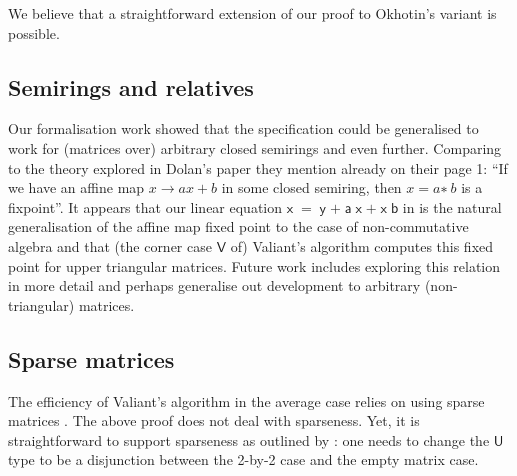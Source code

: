 \documentclass{CSML}
\numberwithin{theorem}{section}
\newcommand{\Conid}[1]{\mathit{#1}}
\newcommand{\Varid}[1]{\mathit{#1}}
\renewcommand\Varid[1]{\ensuremath{\mathsf{#1}}}
\renewcommand\Conid[1]{\ensuremath{\mathsf{#1}}}
\begin{document}
We believe that a straightforward extension of our proof to Okhotin's
variant is possible.

\subsection{Semirings and relatives}

Our formalisation work showed that the specification could be
generalised to work for (matrices over) arbitrary closed semirings
\citep{dolan_fun_2013} and even further.
Comparing to the theory explored in Dolan's paper they mention
already on their page 1:
``If we have an affine map $x → ax + b$ in some closed semiring, then
$x = a{∗~} b$ is a fixpoint''.
It appears that our linear equation \ensuremath{\Varid{x}\;\mathrel{=}\;\Varid{y}\;\Varid{+}\;\Varid{a}\;\Varid{x}\;\Varid{+}\;\Varid{x}\;\Varid{b}} in
 is the natural generalisation of the affine map
fixed point to the case of non-commutative algebra and that (the
corner case \ensuremath{\Conid{V}} of) Valiant's algorithm computes this fixed point for
upper triangular matrices.
Future work includes exploring this relation in more detail and
perhaps generalise out development to arbitrary (non-triangular)
matrices.

\subsection{Sparse matrices}
The efficiency of Valiant's algorithm in the average case relies on
using sparse matrices \citep{bernardy_efficient_2015}.
The above proof does not deal with sparseness.
Yet, it is straightforward to support sparseness as outlined by
\citet{bernardy_efficient_2015}:
one needs to change the \ensuremath{\Conid{U}} type to be a disjunction between the
2-by-2 case and the empty matrix case.
\end{document}
